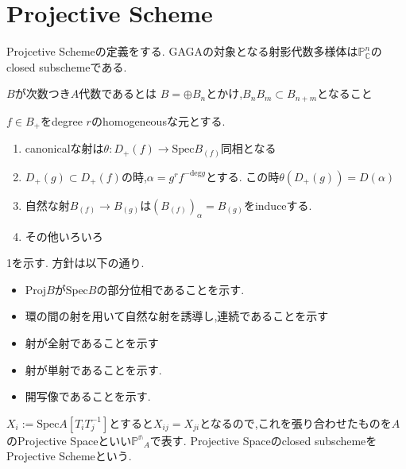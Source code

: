 \section{Projective Scheme}

Projcetive Schemeの定義をする.
GAGAの対象となる射影代数多様体は$\mathbb{P}^n_{\mathbb{C}}$のclosed subschemeである.

\begin{dfn}
$B$が次数つき$A$代数であるとは
$B = \oplus B_n$とかけ,$B_n B_m \subset B_{n+m}$となること
\end{dfn}



\begin{lem}
  $f \in B_+$をdegree $r$のhomogeneousな元とする.
\begin{enumerate}
  \item canonicalな射は$\theta: D_+(f) \to \mathrm{Spec}B_{(f)}$同相となる
  \item $D_+(g) \subset D_+(f)$の時,$\alpha = g^r f^{- \mathrm{deg} g}$とする.
  この時$\theta(D_+(g)) = D(\alpha)$
  \item 自然な射$B_{(f)} \to B_{(g)}$は$(B_{(f)})_{\alpha} = B_{(g)}$をinduceする.
  \item その他いろいろ
\end{enumerate}
\end{lem}
1を示す.
方針は以下の通り.
\begin{itemize}
  \item $\mathrm{Proj}B$が$\mathrm{Spec}B$の部分位相であることを示す.
  \item 環の間の射を用いて自然な射を誘導し,連続であることを示す
  \item 射が全射であることを示す
  \item 射が単射であることを示す.
  \item 開写像であることを示す.
\end{itemize}

\begin{screen}
\begin{dfn}
  $X_i:=\mathrm{Spec}A[T_iT_j^{-1}]$とすると$X_{ij} = X_{ji}$となるので,これを張り合わせたものを$A$のProjective Spaceといい$\mathbb{P^n}_A$で表す.
  Projective Spaceのclosed subschemeをProjective Schemeという.
\end{dfn}
\end{screen}
